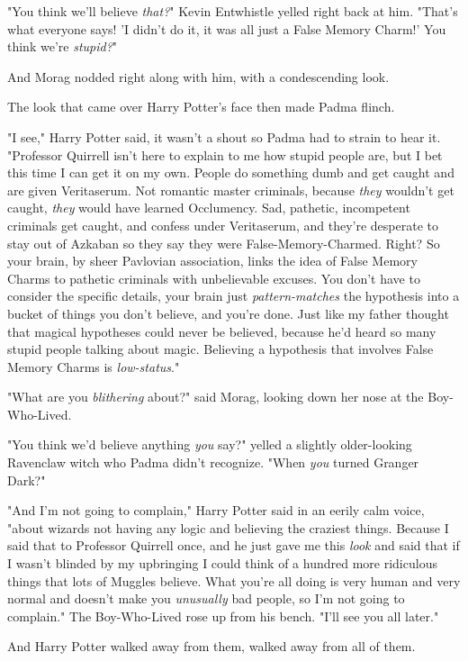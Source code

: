"You think we'll believe\emph{ that?}" Kevin Entwhistle yelled right back at 
him. "That's what everyone says! 'I didn't do it, it was all just a False 
Memory Charm!' You think we're \emph{stupid?}"

And Morag nodded right along with him, with a condescending look.

The look that came over Harry Potter's face then made Padma flinch.

"I see," Harry Potter said, it wasn't a shout so Padma had to strain to hear 
it. "Professor Quirrell isn't here to explain to me how stupid people are, but 
I bet this time I can get it on my own. People do something dumb and get caught 
and are given Veritaserum. Not romantic master criminals, because \emph{they} 
wouldn't get caught, \emph{they} would have learned Occlumency. Sad, pathetic, 
incompetent criminals get caught, and confess under Veritaserum, and they're 
desperate to stay out of Azkaban so they say they were False-Memory-Charmed. 
Right? So your brain, by sheer Pavlovian association, links the idea of False 
Memory Charms to pathetic criminals with unbelievable excuses. You don't have 
to consider the specific details, your brain just \emph{pattern-matches} the 
hypothesis into a bucket of things you don't believe, and you're done. Just 
like my father thought that magical hypotheses could never be believed, because 
he'd heard so many stupid people talking about magic. Believing a hypothesis 
that involves False Memory Charms is \emph{low-status}."

"What are you \emph{blithering} about?" said Morag, looking down her nose at 
the Boy-Who-Lived.

"You think we'd believe anything \emph{you} say?" yelled a slightly 
older-looking Ravenclaw witch who Padma didn't recognize. "When \emph{you} 
turned Granger Dark?"

"And I'm not going to complain," Harry Potter said in an eerily calm voice, 
"about wizards not having any logic and believing the craziest things. Because 
I said that to Professor Quirrell once, and he just gave me this \emph{look} 
and said that if I wasn't blinded by my upbringing I could think of a hundred 
more ridiculous things that lots of Muggles believe. What you're all doing is 
very human and very normal and doesn't make you \emph{unusually} bad people, so 
I'm not going to complain." The Boy-Who-Lived rose up from his bench. "I'll see 
you all later."

And Harry Potter walked away from them, walked away from all of them.


